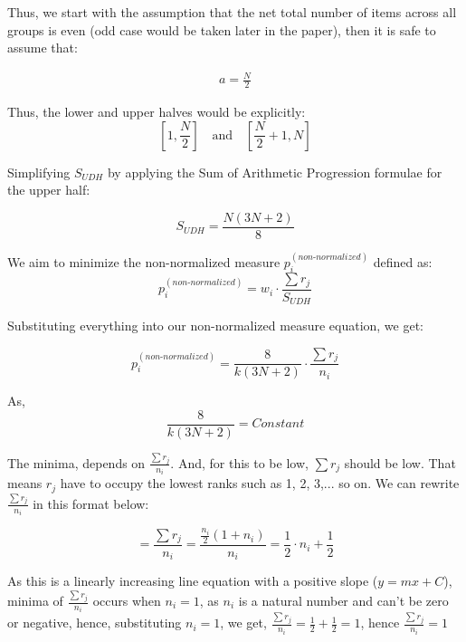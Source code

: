 \documentclass[a4paper,fleqn,review]{cas-sc}
\begin{document}
Thus, we start with the assumption that the net total number of items across all groups is even (odd case would be taken later in the paper), then it is safe to assume that:

\begin{align*}
	a = \frac{N}{2}
\end{align*}

Thus, the lower and upper halves would be explicitly:
\[
\left[1, \frac{N}{2}\right] \quad \text{and} \quad \left[\frac{N}{2}+1, N\right]
\]

Simplifying $S_{UDH}$ by applying the Sum of Arithmetic Progression formulae for the upper half:

\begin{equation}
	S_{UDH} = \frac{N(3N + 2)}{8}
\label{eq:even-SUDH}
\end{equation}


We aim to minimize the non-normalized measure $p_i^{(non\text{-}normalized)}$ defined as:
\begin{equation}
	p_i^{(non\text{-}normalized)} = w_i \cdot \frac{\sum r_j}{ S_{UDH} }
\end{equation}

Substituting everything into our non-normalized measure equation, we get:

\begin{equation}
	p_i^{(non\text{-}normalized)} = \frac{8}{k(3N + 2)}\cdot \frac{\sum r_j}{n_i}
	\label{eq:simplified-even-non-normalized}
\end{equation}


As, 
\begin{equation}
	\frac{8}{k(3N + 2)} = Constant
\end{equation}

The minima, depends on $\frac{\sum r_j}{n_i}$. And, for this to be low, $\sum r_j$ should be low. That means $r_j$ have to occupy the lowest ranks such as 1, 2, 3,... so on. We can rewrite $\frac{\sum r_j}{n_i}$ in this format below:

\begin{equation}
	 = \frac{\sum r_j}{n_i} = \frac{\frac{n_i}{2}(1+n_i)}{n_i} = \frac{1}{2} \cdot n_i + \frac{1}{2}
\end{equation}

As this is a linearly increasing line equation with a positive slope ($y = mx + C$), minima of $\frac{\sum r_j}{n_i}$ occurs when $n_i = 1$, as $n_i$ is a natural number and can't be zero or negative, hence, substituting $n_i = 1$, we get, $\frac{\sum r_j}{n_i} = \frac{1}{2} + \frac{1}{2} = 1$, hence  $\frac{\sum r_j}{n_i} = 1 $
\end{document}
